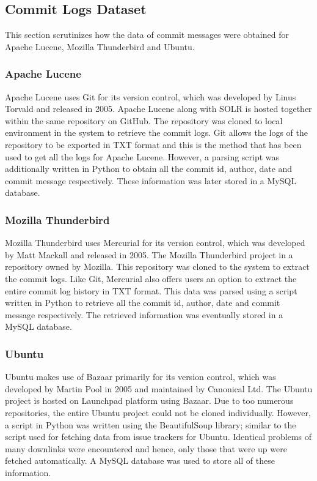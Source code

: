 \documentclass[a4paper,12pt,twoside]{report}
\begin{document}
\subsection{Commit Logs Dataset}
This section scrutinizes how the data of commit messages were obtained for Apache Lucene, Mozilla Thunderbird and Ubuntu.

\subsubsection{Apache Lucene}
Apache Lucene uses Git for its version control, which was developed by Linus Torvald and released in 2005. Apache Lucene along with SOLR is hosted together within the same repository on GitHub. The repository was cloned to local environment in the system to retrieve the commit logs. Git allows the logs of the repository to be exported in TXT format and this is the method that has been used to get all the logs for Apache Lucene. However, a parsing script was additionally written in Python to obtain all the commit id, author, date and commit message respectively. These information was later stored in a MySQL database. 

\subsubsection{Mozilla Thunderbird}
Mozilla Thunderbird uses Mercurial for its version control, which was developed by Matt Mackall and released in 2005. The Mozilla Thunderbird project in a repository owned by Mozilla. This repository was cloned to the system to extract the commit logs. Like Git, Mercurial also offers users an option to extract the entire commit log history in TXT format. This data was parsed using a script written in Python to retrieve all the commit id, author, date and commit message respectively. The retrieved information was eventually stored in a MySQL database. 

\subsubsection{Ubuntu}
Ubuntu makes use of Bazaar primarily for its version control, which was developed by Martin Pool in 2005 and maintained by Canonical Ltd. The Ubuntu project is hosted on Launchpad platform using Bazaar. Due to too numerous repositories, the entire Ubuntu project could not be cloned individually. However, a script in Python was written using the BeautifulSoup library; similar to the script used for fetching data from issue trackers for Ubuntu. Identical problems of many downlinks were encountered and hence, only those that were up were fetched automatically. A MySQL database was used to store all of these information. 
\end{document}
